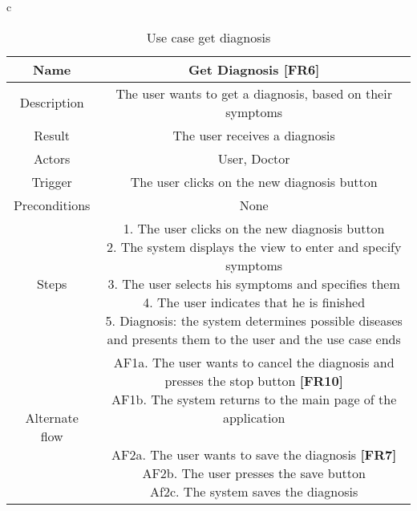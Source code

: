 c
\begin{table}[H]
	\begin{center}\scriptsize
		\def\arraystretch{2}%
		\begin{tabular}{ c|c } 
			\hline
			Name & Get Diagnosis \textbf{[FR6]}\\
			\hline	
			Description & The user wants to get a diagnosis, based on their symptoms \\ 
			\hline
			Result & The user receives a diagnosis \\ 
			\hline
			Actors & User, Doctor \\ 
			\hline
			Trigger & The user clicks on the new diagnosis button \\ 
			\hline
			Preconditions & None \\ 
			\hline
			Steps & \parbox{9cm}{\vspace{.5\baselineskip}
				1. The user clicks on the new diagnosis button\\
				2. The system displays the view to enter and specify symptoms\\
				3. The user selects his symptoms and specifies them\\
				4. The user indicates that he is finished\\
				5. Diagnosis: the system determines possible diseases and presents them to the user and the use case ends}\\
			\hline
			Alternate flow & \parbox{9cm}{
				AF1a. The user wants to cancel the diagnosis and presses the stop button \textbf{[FR10]}\\
				AF1b. The system returns to the main page of the application\\\\
				AF2a. The user wants to save the diagnosis \textbf{[FR7]}\\
				AF2b. The user presses the save button\\
				Af2c. The system saves the diagnosis
			}\\ 
			\hline
		\end{tabular}\normalsize
	\end{center}
	\caption{Use case get diagnosis}
\end{table}
